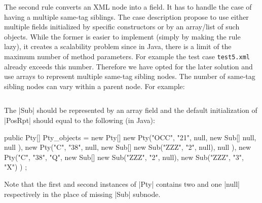 The second rule converts an XML node into a field.
It has to handle the case of having a multiple same-tag siblings.
The case description propose to use either multiple fields initialized by specific constructors or by an array/list of such objects.
While the former is easier to implement (simply by making the rule lazy), it creates a scalability problem since in Java, there is a limit of the maximum number of method parameters.
For example the test case \texttt{test5.xml} already exceeds this number.
Therefore we have opted for the later solution and use arrays to represent multiple same-tag sibling nodes.
The number of same-tag sibling nodes can vary within a parent node.
For example:
%
\inputminted[fontsize=\fontsize{8}{8},linenos,numbersep=5pt,frame=lines,framesep=2mm]{xml}{listings/variable-siblings.xml}
%
The \Scala|Sub| should be represented by an array field and the default initialization of \Scala|PosRpt| should equal to the following (in Java):
\begin{javacode}
public Pty[] Pty_objects = new Pty[] { 
  new Pty("OCC", "21", null, new Sub[] { null, null }),
  new Pty("C", "38", null, new Sub[] { new Sub("ZZZ", "2", null), null }),
  new Pty("C", "38", "Q", new Sub[] { new Sub("ZZZ", "2", null), new Sub("ZZZ", "3", "X") }) 
};
\end{javacode}
Note that the first and second instances of \Scala|Pty| contains two and one \Scala|null| respectively in the place of missing \Scala|Sub| subnode.

